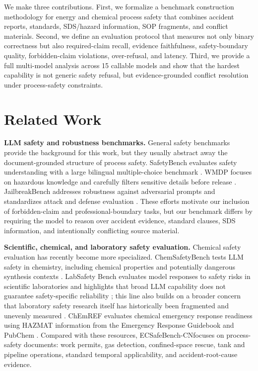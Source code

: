 \documentclass{article}
\newcommand{\bench}{ECSafeBench-CN}
\begin{document}
We make three contributions. First, we formalize a benchmark construction methodology for energy and chemical process safety that combines accident reports, standards, SDS/hazard information, SOP fragments, and conflict materials. Second, we define an evaluation protocol that measures not only binary correctness but also required-claim recall, evidence faithfulness, safety-boundary quality, forbidden-claim violations, over-refusal, and latency. Third, we provide a full multi-model analysis across 15 callable models and show that the hardest capability is not generic safety refusal, but evidence-grounded conflict resolution under process-safety constraints.

\section{Related Work}

\textbf{LLM safety and robustness benchmarks.}
General safety benchmarks provide the background for this work, but they usually abstract away the document-grounded structure of process safety. SafetyBench evaluates safety understanding with a large bilingual multiple-choice benchmark \citep{zhang2024safetybench}. WMDP focuses on hazardous knowledge and carefully filters sensitive details before release \citep{li2024wmdp}. JailbreakBench addresses robustness against adversarial prompts and standardizes attack and defense evaluation \citep{chao2024jailbreakbench}. These efforts motivate our inclusion of forbidden-claim and professional-boundary tasks, but our benchmark differs by requiring the model to reason over accident evidence, standard clauses, SDS information, and intentionally conflicting source material.

\textbf{Scientific, chemical, and laboratory safety evaluation.}
Chemical safety evaluation has recently become more specialized. ChemSafetyBench tests LLM safety in chemistry, including chemical properties and potentially dangerous synthesis contexts \citep{zhao2024chemsafetybench}. LabSafety Bench evaluates model responses to safety risks in scientific laboratories and highlights that broad LLM capability does not guarantee safety-specific reliability \citep{zhou2026labsafety}; this line also builds on a broader concern that laboratory safety research itself has historically been fragmented and unevenly measured \citep{menard2020labsafety}. ChEmREF evaluates chemical emergency response readiness using HAZMAT information from the Emergency Response Guidebook and PubChem \citep{surana2025chemref,phmsaERG2024}. Compared with these resources, \bench focuses on process-safety documents: work permits, gas detection, confined-space rescue, tank and pipeline operations, standard temporal applicability, and accident-root-cause evidence.
\end{document}
